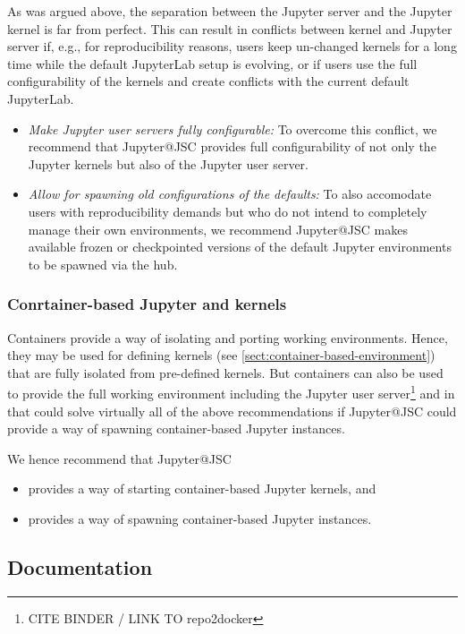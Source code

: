 As was argued above, the separation between the Jupyter server and the Jupyter kernel is far from perfect.
This can result in conflicts between kernel and Jupyter server if, e.g., for reproducibility reasons, users keep un-changed kernels for a long time while the default JupyterLab setup is evolving, or if users use the full configurability of the kernels and create conflicts with the current default JupyterLab.

\begin{itemize}
  \item \emph{Make Jupyter user servers fully configurable:} To overcome this conflict, we recommend that Jupyter@JSC provides full configurability of not only the Jupyter kernels but also of the Jupyter user server.
  \item \emph{Allow for spawning old configurations of the defaults:} To also accomodate users with reproducibility demands but who do not intend to completely manage their own environments, we recommend Jupyter@JSC makes available frozen or checkpointed versions of the default Jupyter environments to be spawned via the hub.
\end{itemize}

\subsubsection{Conrtainer-based Jupyter and kernels}

Containers provide a way of isolating and porting working environments.
Hence, they may be used for defining kernels (see \ref{sect:container-based-environment}) that are fully isolated from pre-defined kernels.
But containers can also be used to provide the full working environment including the Jupyter user server\footnote{CITE BINDER / LINK TO repo2docker} and in that could solve virtually all of the above recommendations if Jupyter@JSC could provide a way of spawning container-based Jupyter instances.

We hence recommend that Jupyter@JSC
\begin{itemize}
  \item provides a way of starting container-based Jupyter kernels, and
  \item provides a way of spawning container-based Jupyter instances.
\end{itemize}

\subsection{Documentation}

